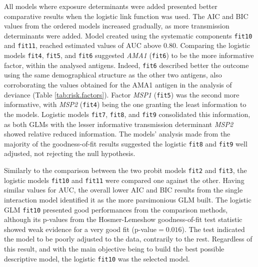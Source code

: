 All models where exposure determinants were added presented better comparative results when the logistic link function was used.
The AIC and BIC values from the ordered models increased gradually, as more transmission determinants were added.
Model created using the systematic components \texttt{fit10} and \texttt{fit11}, reached estimated values of AUC above 0.80.
Comparing the logistic models \texttt{fit4}, \texttt{fit5}, and \texttt{fit6} suggested \textit{AMA1} (\texttt{fit6}) to be the more informative factor, within the analysed antigens.
Indeed, \texttt{fit6} described better the outcome using the same demographical structure as the other two antigens, also corroborating the values obtained for the AMA1 antigen in the analysis of deviance (Table \ref{tab:risk.factors}).
Factor \textit{MSP1} (\texttt{fit5}) was the second more informative, with \textit{MSP2} (\texttt{fit4}) being the one granting the least information to the models.
Logistic models \texttt{fit7}, \texttt{fit8}, and \texttt{fit9} consolidated this information, as both GLMs with the lesser informative transmission determinant \textit{MSP2} showed relative reduced information.
The models' analysis made from the majority of the goodness-of-fit results suggested the logistic \texttt{fit8} and \texttt{fit9} well adjusted, not rejecting the null hypothesis.

Similarly to the comparison between the two probit models \texttt{fit2} and \texttt{fit3}, the logistic models \texttt{fit10} and \texttt{fit11} were compared one against the other.
Having similar values for AUC, the overall lower AIC and BIC results from the single interaction model identified it as the more parsimonious GLM built.
The logistic GLM \texttt{fit10} presented good performances from the comparison methods, although its p-values from the Hosmer-Lemeshow goodness-of-fit test statistic showed weak evidence for a very good fit (p-value$=0.016$).
The test indicated the model to be poorly adjusted to the data, contrarily to the rest.
Regardless of this result, and with the main objective being to build the best possible descriptive model, the logistic \texttt{fit10} was the selected model.

